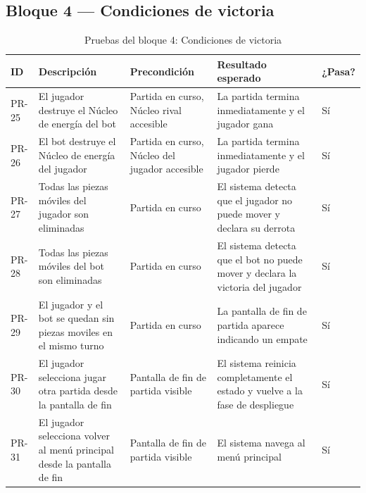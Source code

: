 \clearpage

\subsection{Bloque 4 — Condiciones de victoria}

\begin{table}[H]
	\centering
	\small
	\begin{tabular}{|>{\centering\arraybackslash}p{1cm}|>{\centering\arraybackslash}p{4cm}|>{\centering\arraybackslash}p{4cm}|>{\centering\arraybackslash}p{4cm}|>{\centering\arraybackslash}p{1.5cm}|}
		\hline
		\textbf{ID} & \textbf{Descripción} & \textbf{Precondición} & \textbf{Resultado esperado} & \textbf{¿Pasa?} \\
		\hline
		PR-25 & El jugador destruye el Núcleo de energía del bot & Partida en curso, Núcleo rival accesible & La partida termina inmediatamente y el jugador gana & \cellcolor{green!40}Sí \\
		\hline
		PR-26 & El bot destruye el Núcleo de energía del jugador & Partida en curso, Núcleo del jugador accesible & La partida termina inmediatamente y el jugador pierde & \cellcolor{green!40}Sí \\
		\hline
		PR-27 & Todas las piezas móviles del jugador son eliminadas & Partida en curso & El sistema detecta que el jugador no puede mover y declara su derrota & \cellcolor{green!40}Sí \\
		\hline
		PR-28 & Todas las piezas móviles del bot son eliminadas & Partida en curso & El sistema detecta que el bot no puede mover y declara la victoria del jugador & \cellcolor{green!40}Sí \\
		\hline
		PR-29 & El jugador y el bot se quedan sin piezas moviles en el mismo turno & Partida en curso & La pantalla de fin de partida aparece indicando un empate & \cellcolor{green!40}Sí \\
		\hline
		PR-30 & El jugador selecciona jugar otra partida desde la pantalla de fin & Pantalla de fin de partida visible & El sistema reinicia completamente el estado y vuelve a la fase de despliegue & \cellcolor{green!40}Sí \\
		\hline
		PR-31 & El jugador selecciona volver al menú principal desde la pantalla de fin & Pantalla de fin de partida visible & El sistema navega al menú principal & \cellcolor{green!40}Sí \\
		\hline
	\end{tabular}
	\caption{Pruebas del bloque 4: Condiciones de victoria}
\end{table}

